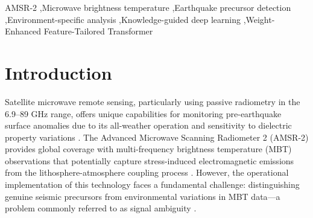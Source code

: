 \documentclass[preprint,review,12pt,authoryear]{elsarticle}
\begin{document}
\begin{frontmatter}
\begin{abstract}
Satellite-based earthquake monitoring using microwave brightness temperature (MBT) is fundamentally challenged by the signal ambiguity problem, where pre-seismic anomalies are difficult to distinguish from non-seismic environmental variations. We address this challenge by developing an environment-specific, knowledge-guided deep learning framework to analyze Advanced Microwave Scanning Radiometer 2 (AMSR-2) data. Our approach first classifies the Earth's surface into five distinct environmental zones. Within each zone, we use association rule mining to discover reliable precursor signatures (e.g., specific 89 GHz H-polarization patterns over marine environments). This knowledge is then integrated into a novel Weight-Enhanced Feature-Tailored Transformer (WE-FTT) model to guide its focus. Validated on a dataset of 346.56 million MBT measurements across 154 major earthquakes (M$\ge$7.0, 2013-2023), the WE-FTT achieves a Matthews Correlation Coefficient of approximately 0.84, significantly outperforming conventional global methods. This environment-specific approach transforms satellite earthquake monitoring from an ambiguous global analysis into a reliable, context-aware detection system. This methodology not only advances satellite-based geohazard assessment but also provides a robust foundation for developing future operational earthquake early warning systems.
\end{abstract}

\begin{keyword}
AMSR-2 \sep Microwave brightness temperature \sep Earthquake precursor detection \sep Environment-specific analysis \sep Knowledge-guided deep learning \sep Weight-Enhanced Feature-Tailored Transformer
\end{keyword}

\end{frontmatter}


\section{Introduction} 
Satellite microwave remote sensing, particularly using passive radiometry in the 6.9--89 GHz range, offers unique capabilities for monitoring pre-earthquake surface anomalies due to its all-weather operation and sensitivity to dielectric property variations \citep{pulinetsLithosphereAtmosphereIonosphere2011,wuGEOSSbasedThermalParameters2012}. The Advanced Microwave Scanning Radiometer 2 (AMSR-2) provides global coverage with multi-frequency brightness temperature (MBT) observations that potentially capture stress-induced electromagnetic emissions from the lithosphere-atmosphere coupling process \citep{kawanishiAdvancedMicrowaveScanning2003}. However, the operational implementation of this technology faces a fundamental challenge: distinguishing genuine seismic precursors from environmental variations in MBT data---a problem commonly referred to as signal ambiguity \citep{troninRemoteSensingEarthquakes2006,tramutoliRobustSatelliteTechniques2013}.
\end{document}

